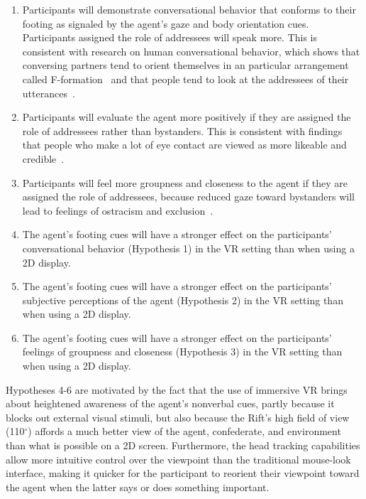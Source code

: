\begin{enumerate}
\item Participants will demonstrate conversational behavior that conforms to their footing as signaled by the agent's gaze and body orientation cues. Participants assigned the role of addressees will speak more. This is consistent with research on human conversational behavior, which shows that conversing partners tend to orient themselves in an particular arrangement called F-formation~\citep{kendon1990conducting} and that people tend to look at the addressees of their utterances~\citep{kendon1967some}.
\item Participants will evaluate the agent more positively if they are assigned the role of addressees rather than bystanders. This is consistent with findings that people who make a lot of eye contact are viewed as more likeable and credible~\citep{argyle1976gaze,beebe1976effects}.
\item Participants will feel more groupness and closeness to the agent if they are assigned the role of addressees, because reduced gaze toward bystanders will lead to feelings of ostracism and exclusion~\citep{wirth2010eye}.
\item The agent's footing cues will have a stronger effect on the participants' conversational behavior (Hypothesis 1) in the VR setting than when using a 2D display.
\item The agent's footing cues will have a stronger effect on the participants' subjective perceptions of the agent (Hypothesis 2) in the VR setting than when using a 2D display.
\item The agent's footing cues will have a stronger effect on the participants' feelings of groupness and closeness (Hypothesis 3) in the VR setting than when using a 2D display.
\end{enumerate}

Hypotheses 4-6 are motivated by the fact that the use of immersive VR brings about heightened awareness of the agent's nonverbal cues, partly because it blocks out external visual stimuli, but also because the Rift's high field of view (110$^\circ$) affords a much better view of the agent, confederate, and environment than what is possible on a 2D screen. Furthermore, the head tracking capabilities allow more intuitive control over the viewpoint than the traditional mouse-look interface, making it quicker for the participant to reorient their viewpoint toward the agent when the latter says or does something important.


